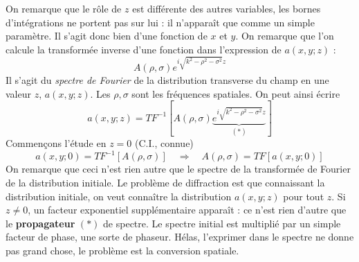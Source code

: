 On remarque que le rôle de $z$ est différente des autres variables, les bornes d'intégrations 
ne portent pas sur lui : il n'apparaît que comme un simple paramètre. Il s'agit donc bien d'une 
fonction de $x$ et $y$. On remarque que l'on calcule la transformée inverse d'une fonction dans 
l'expression de $a(x,y;z)$ :
\begin{equation}
A(\rho,\sigma)e^{i\sqrt{k^2-\rho^2-\sigma^2}z}
\end{equation}
Il s'agit du \textit{spectre de Fourier} de la distribution transverse du champ en une valeur $z$, 
$a(x,y;z)$. Les $\rho,\sigma$ sont les fréquences spatiales. On peut ainsi écrire
\begin{equation}
a(x,y;z) = TF^{-1}\left[ A(\rho,\sigma)\underbrace{e^{i\sqrt{k^2-\rho^2-\sigma^2}z} }_{(*)}\right]
\end{equation}
Commençons l'étude en $z=0$ (C.I., connue)
\begin{equation}
a(x,y;0) = TF^{-1}\left[ A(\rho,\sigma) \right]\quad \Rightarrow \quad A(\rho,\sigma) = TF[
a(x,y;0)]
\end{equation}
On remarque que ceci n'est rien autre que le spectre de la transformée de Fourier de la distribution 
initiale. Le problème de diffraction est que connaissant la distribution initiale, on veut connaître 
la distribution $a(x,y;z)$ pour tout $z$. Si $z\neq0$, un facteur exponentiel supplémentaire apparaît 
: ce n'est rien d'autre que le \textbf{propagateur} $(*)$ de spectre. Le spectre initial est multiplié 
par un simple facteur de phase, une sorte de phaseur. Hélas, l'exprimer dans le spectre ne donne pas 
grand chose, le problème est la conversion spatiale.\\


